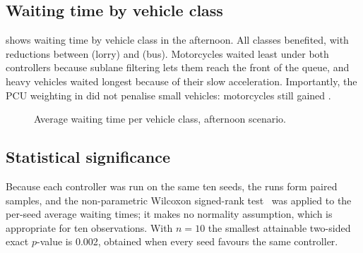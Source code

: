 \subsection{Waiting time by vehicle class}

 shows waiting time by vehicle class in the afternoon. All classes benefited, with reductions between  (lorry) and  (bus). Motorcycles waited least under both controllers because sublane filtering lets them reach the front of the queue, and heavy vehicles waited longest because of their slow acceleration. Importantly, the PCU weighting in \prism{} did not penalise small vehicles: motorcycles still gained .

\begin{figure}[H]
\centering
{}
\caption{Average waiting time per vehicle class, afternoon scenario.}
\label{fig:class-wait}
\end{figure}

\subsection{Statistical significance}

Because each controller was run on the same ten seeds, the runs form paired samples, and the non-parametric Wilcoxon signed-rank test~\cite{wilcoxon1945} was applied to the per-seed average waiting times; it makes no normality assumption, which is appropriate for ten observations. With $n=10$ the smallest attainable two-sided exact $p$-value is 0.002, obtained when every seed favours the same controller.

